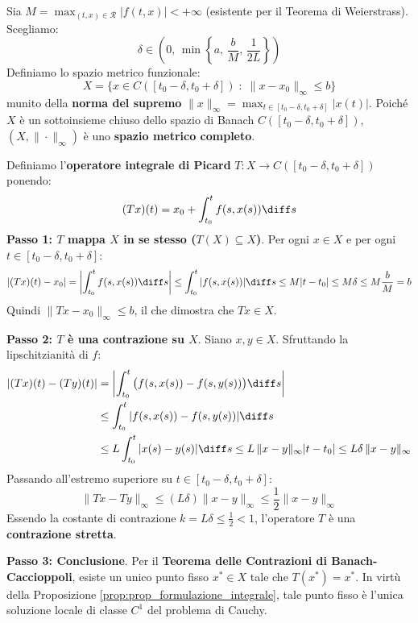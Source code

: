 \begin{dimostrazione}
Sia $M = \max_{(t,x) \in \mathcal{R}} |f(t, x)| < +\infty$ (esistente per il Teorema di Weierstrass). Scegliamo:
\[
    \delta \in \left( 0, \, \min\left\{ a, \, \frac{b}{M}, \, \frac{1}{2L} \right\} \right)
\]
Definiamo lo spazio metrico funzionale:
\[
    X = \big\{ x \in C([t_0 - \delta, t_0 + \delta]) \;\colon\; \|x - x_0\|_\infty \le b \big\}
\]
munito della \textbf{norma del supremo} $\|x\|_\infty = \max_{t \in [t_0-\delta, t_0+\delta]} |x(t)|$. Poiché $X$ è un sottoinsieme chiuso dello spazio di Banach $C([t_0-\delta, t_0+\delta])$, $(X, \|\cdot\|_\infty)$ è uno \textbf{spazio metrico completo}.

Definiamo l'\textbf{operatore integrale di Picard} $T \colon X \to C([t_0 - \delta, t_0 + \delta])$ ponendo:
\[
    (Tx)(t) = x_0 + \int_{t_0}^t f(s, x(s)) \diff s
\]
\textbf{Passo 1: $T$ mappa $X$ in se stesso ($T(X) \subseteq X$)}.
Per ogni $x \in X$ e per ogni $t \in [t_0 - \delta, t_0 + \delta]$:
\[
    |(Tx)(t) - x_0| = \left| \int_{t_0}^t f(s, x(s)) \diff s \right| \le \int_{t_0}^t |f(s, x(s))| \diff s \le M |t - t_0| \le M\delta \le M \frac{b}{M} = b
\]
Quindi $\|Tx - x_0\|_\infty \le b$, il che dimostra che $Tx \in X$.

\textbf{Passo 2: $T$ è una contrazione su $X$}.
Siano $x, y \in X$. Sfruttando la lipschitzianità di $f$:
\begin{align*}
    |(Tx)(t) - (Ty)(t)| &= \left| \int_{t_0}^t \big( f(s, x(s)) - f(s, y(s)) \big) \diff s \right| \\
    &\le \int_{t_0}^t |f(s, x(s)) - f(s, y(s))| \diff s \\
    &\le L \int_{t_0}^t |x(s) - y(s)| \diff s \le L\, \|x - y\|_\infty |t - t_0| \le L\delta\, \|x - y\|_\infty
\end{align*}
Passando all'estremo superiore su $t \in [t_0 - \delta, t_0 + \delta]$:
\[
    \|Tx - Ty\|_\infty \le (L\delta) \|x - y\|_\infty \le \frac{1}{2} \|x - y\|_\infty
\]
Essendo la costante di contrazione $k = L\delta \le \frac{1}{2} < 1$, l'operatore $T$ è una \textbf{contrazione stretta}.

\textbf{Passo 3: Conclusione}.
Per il \textbf{Teorema delle Contrazioni di Banach-Caccioppoli}, esiste un unico punto fisso $x^* \in X$ tale che $T(x^*) = x^*$. In virtù della Proposizione \ref{prop:prop_formulazione_integrale}, tale punto fisso è l'unica soluzione locale di classe $C^1$ del problema di Cauchy.
\end{dimostrazione}

